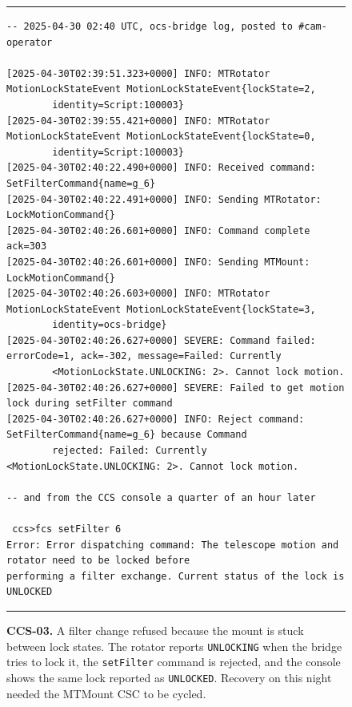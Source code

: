 \begin{description}
\begin{figure}[H]
\centering
\begin{minipage}{\textwidth}
\hrule\vspace{4pt}
\begingroup\scriptsize
\begin{verbatim}
-- 2025-04-30 02:40 UTC, ocs-bridge log, posted to #cam-operator

[2025-04-30T02:39:51.323+0000] INFO: MTRotator MotionLockStateEvent MotionLockStateEvent{lockState=2,
        identity=Script:100003}
[2025-04-30T02:39:55.421+0000] INFO: MTRotator MotionLockStateEvent MotionLockStateEvent{lockState=0,
        identity=Script:100003}
[2025-04-30T02:40:22.490+0000] INFO: Received command: SetFilterCommand{name=g_6}
[2025-04-30T02:40:22.491+0000] INFO: Sending MTRotator: LockMotionCommand{}
[2025-04-30T02:40:26.601+0000] INFO: Command complete ack=303
[2025-04-30T02:40:26.601+0000] INFO: Sending MTMount: LockMotionCommand{}
[2025-04-30T02:40:26.603+0000] INFO: MTRotator MotionLockStateEvent MotionLockStateEvent{lockState=3,
        identity=ocs-bridge}
[2025-04-30T02:40:26.627+0000] SEVERE: Command failed: errorCode=1, ack=-302, message=Failed: Currently
        <MotionLockState.UNLOCKING: 2>. Cannot lock motion.
[2025-04-30T02:40:26.627+0000] SEVERE: Failed to get motion lock during setFilter command
[2025-04-30T02:40:26.627+0000] INFO: Reject command: SetFilterCommand{name=g_6} because Command
        rejected: Failed: Currently <MotionLockState.UNLOCKING: 2>. Cannot lock motion.

-- and from the CCS console a quarter of an hour later

 ccs>fcs setFilter 6
Error: Error dispatching command: The telescope motion and rotator need to be locked before
performing a filter exchange. Current status of the lock is UNLOCKED
\end{verbatim}
\endgroup
\vspace{-10pt}\hrule
\end{minipage}
\caption{\textbf{CCS-03.} A filter change refused because the mount is stuck between lock states.  The rotator reports \texttt{UNLOCKING} when the bridge tries to lock it, the \texttt{setFilter} command is rejected, and the console shows the same lock reported as \texttt{UNLOCKED}.  Recovery on this night needed the MTMount CSC to be cycled.}
\label{fig:iss-CCS-03}
\end{figure}


\end{description}

